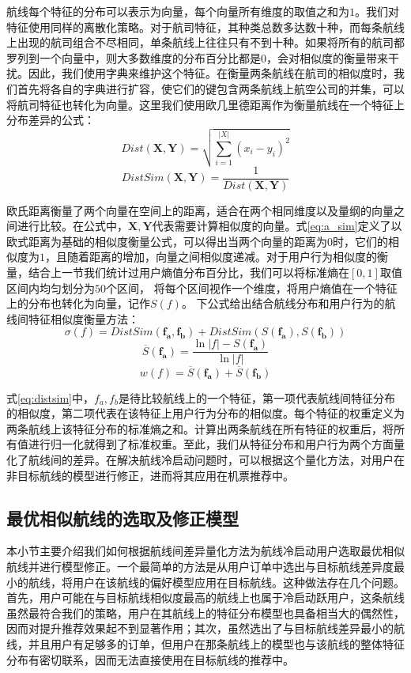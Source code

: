 航线每个特征的分布可以表示为向量，每个向量所有维度的取值之和为$1$。我们对特征使用同样的离散化策略。对于航司特征，其种类总数多达数十种，而每条航线上出现的航司组合不尽相同，单条航线上往往只有不到十种。如果将所有的航司都罗列到一个向量中，则大多数维度的分布百分比都是$0$，会对相似度的衡量带来干扰。因此，我们使用字典来维护这个特征。在衡量两条航线在航司的相似度时，我们首先将各自的字典进行扩容，使它们的键包含两条航线上航空公司的并集，可以将航司特征也转化为向量。这里我们使用欧几里德距离作为衡量航线在一个特征上分布差异的公式：
\begin{equation}
	Dist(\mathbf{X},\mathbf{Y}) = \sqrt{\sum_{i=1}^{|X|}(x_i-y_i)^2}
\end{equation}
\begin{equation}
\label{eq:a_sim}
	DistSim(\mathbf{X},\mathbf{Y}) = \frac{1}{Dist(\mathbf{X},\mathbf{Y})}
\end{equation}

欧氏距离衡量了两个向量在空间上的距离，适合在两个相同维度以及量纲的向量之间进行比较。在公式中，$\mathbf{X}, \mathbf{Y}$代表需要计算相似度的向量。式\ref{eq:a_sim}定义了以欧式距离为基础的相似度衡量公式，可以得出当两个向量的距离为$0$时，它们的相似度为$1$，且随着距离的增加，向量之间相似度递减。对于用户行为相似度的衡量，结合上一节我们统计过用户熵值分布百分比，我们可以将标准熵在$[0,1]$取值区间内均匀划分为$50$个区间，
将每个区间视作一个维度，将用户熵值在一个特征上的分布也转化为向量，记作$S(f)$。
下公式给出结合航线分布和用户行为的航线间特征相似度衡量方法：
\begin{equation}
  \label{eq:distsim}
	\sigma(f) = DistSim(\mathbf{f_a,f_b}) + DistSim(S(\mathbf{f_a}),S(\mathbf{f_b}))
\end{equation}
\begin{equation}
	\overline{S}(\mathbf{f_a}) = \frac{\ln |f| - S(\mathbf{f_a})}{\ln |f|}
\end{equation}
\begin{equation}
	w(f) = \overline{S}(\mathbf{f_a}) + \overline{S}(\mathbf{f_b})
\end{equation}

式\ref{eq:distsim}中，$f_a, f_b$是待比较航线上的一个特征，第一项代表航线间特征分布的相似度，第二项代表在该特征上用户行为分布的相似度。每个特征的权重定义为两条航线上该特征分布的标准熵之和。计算出两条航线在所有特征的权重后，将所有值进行归一化就得到了标准权重。至此，我们从特征分布和用户行为两个方面量化了航线间的差异。在解决航线冷启动问题时，可以根据这个量化方法，对用户在非目标航线的模型进行修正，进而将其应用在机票推荐中。

\subsection{最优相似航线的选取及修正模型}
本小节主要介绍我们如何根据航线间差异量化方法为航线冷启动用户选取最优相似航线并进行模型修正。一个最简单的方法是从用户订单中选出与目标航线差异度最小的航线，将用户在该航线的偏好模型应用在目标航线。这种做法存在几个问题。首先，用户可能在与目标航线相似度最高的航线上也属于冷启动跃用户，这条航线虽然最符合我们的策略，用户在其航线上的特征分布模型也具备相当大的偶然性，因而对提升推荐效果起不到显著作用；其次，虽然选出了与目标航线差异最小的航线，并且用户有足够多的订单，但用户在那条航线上的模型也与该航线的整体特征分布有密切联系，因而无法直接使用在目标航线的推荐中。

